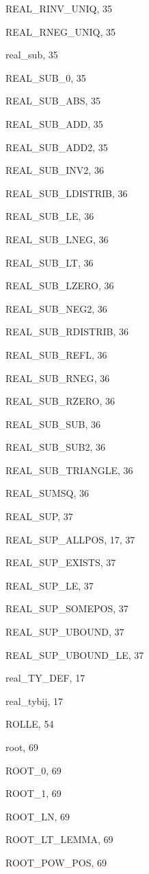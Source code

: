 \begin{theindex}
  \item {\ptt REAL\_RINV\_UNIQ}, 35
  \item {\ptt REAL\_RNEG\_UNIQ}, 35
  \item {\ptt real\_sub}, 35
  \item {\ptt REAL\_SUB\_0}, 35
  \item {\ptt REAL\_SUB\_ABS}, 35
  \item {\ptt REAL\_SUB\_ADD}, 35
  \item {\ptt REAL\_SUB\_ADD2}, 35
  \item {\ptt REAL\_SUB\_INV2}, 36
  \item {\ptt REAL\_SUB\_LDISTRIB}, 36
  \item {\ptt REAL\_SUB\_LE}, 36
  \item {\ptt REAL\_SUB\_LNEG}, 36
  \item {\ptt REAL\_SUB\_LT}, 36
  \item {\ptt REAL\_SUB\_LZERO}, 36
  \item {\ptt REAL\_SUB\_NEG2}, 36
  \item {\ptt REAL\_SUB\_RDISTRIB}, 36
  \item {\ptt REAL\_SUB\_REFL}, 36
  \item {\ptt REAL\_SUB\_RNEG}, 36
  \item {\ptt REAL\_SUB\_RZERO}, 36
  \item {\ptt REAL\_SUB\_SUB}, 36
  \item {\ptt REAL\_SUB\_SUB2}, 36
  \item {\ptt REAL\_SUB\_TRIANGLE}, 36
  \item {\ptt REAL\_SUMSQ}, 36
  \item {\ptt REAL\_SUP}, 37
  \item {\ptt REAL\_SUP\_ALLPOS}, 17, 37
  \item {\ptt REAL\_SUP\_EXISTS}, 37
  \item {\ptt REAL\_SUP\_LE}, 37
  \item {\ptt REAL\_SUP\_SOMEPOS}, 37
  \item {\ptt REAL\_SUP\_UBOUND}, 37
  \item {\ptt REAL\_SUP\_UBOUND\_LE}, 37
  \item {\ptt real\_TY\_DEF}, 17
  \item {\ptt real\_tybij}, 17
  \item {\ptt ROLLE}, 54
  \item {\ptt root}, 69
  \item {\ptt ROOT\_0}, 69
  \item {\ptt ROOT\_1}, 69
  \item {\ptt ROOT\_LN}, 69
  \item {\ptt ROOT\_LT\_LEMMA}, 69
  \item {\ptt ROOT\_POW\_POS}, 69


\end{theindex}
